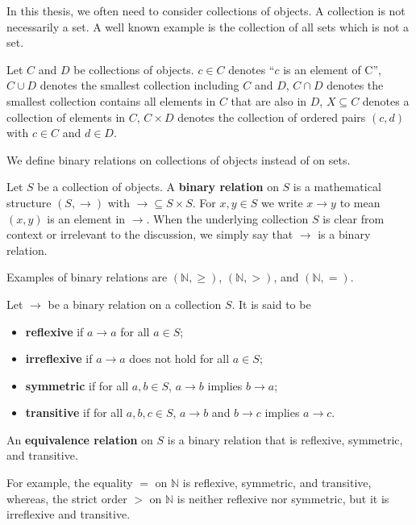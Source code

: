 In this thesis, we often need to consider collections of objects.
 A collection is not necessarily a set. A well known example is the collection of all sets which is not a set.
\begin{notation}
    Let $C$ and $D$ be collections of objects. $c \in C$ denotes \enquote{$c$ is an element of C}, $C \cup D$ denotes the smallest collection including $C$ and $D$, $C \cap D$ denotes the smallest collection contains all elements in $C$ that are also in $D$,
    $X \subseteq C$ denotes a collection of elements in $C$,
     $C \times D$ denotes the collection of ordered pairs $(c,d)$ with $c \in C$ and $d \in D$.
  \end{notation} 
    
    
  We define binary relations on collections of objects instead of on sets. 
\begin{definition}
    \label{def:binary_relation:binary_relation}
    Let $S$ be a collection of objects. A \textbf{binary relation} on $S$ is a mathematical structure \((S,\to)\) with \(\to \subseteq S\times S\). For \(x,y\in S\) we write \(x\to y\) to mean \((x,y)\) is an element in \(\to\). When the underlying collection \(S\) is clear from context or irrelevant to the discussion, we simply say that \(\to\) is a binary relation.
  \end{definition}
  Examples of binary relations are \((\mathbb{N}, \geq)\), \((\mathbb{N}, >)\), and \((\mathbb{N}, =)\).
  \begin{definition}
    \label{def:binary_relation:reflexivity_transitivity}
    Let \(\to\) be a binary relation on a collection \(S\). It is said to be
    \begin{itemize}
      \item \textbf{reflexive} if $a \to a$ for all $a \in S$;
      \item \textbf{irreflexive} if $a \to a$ does not hold for all $a \in S$;
      \item \textbf{symmetric} if for all $a,b \in S$, $a \to b$ implies $b \to a$;
      \item \textbf{transitive} if for all $a,b,c \in S$, $a \to b$ and $b \to c$ implies $a \to c$.
    \end{itemize}
    An \textbf{equivalence relation} on $S$ is a binary relation that is reflexive, symmetric, and transitive.
  \end{definition}
For example, the equality \(=\) on \(\mathbb{N}\) is reflexive, symmetric, and transitive, whereas, the strict order \(>\) on \(\mathbb{N}\) is neither reflexive nor symmetric, but it is irreflexive and transitive.

